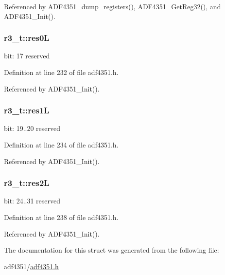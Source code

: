 Referenced by A\+D\+F4351\+\_\+dump\+\_\+registers(), A\+D\+F4351\+\_\+\+Get\+Reg32(), and A\+D\+F4351\+\_\+\+Init().

\subsubsection[{\texorpdfstring{res0L}{res0L}}]{ r3\+\_\+t\+::res0L}\hypertarget{structr3__t_aa10065b1b2c2aed70a9e4427e76db29a}{}\label{structr3__t_aa10065b1b2c2aed70a9e4427e76db29a}
bit\+: 17 reserved 

Definition at line 232 of file adf4351.\+h.



Referenced by A\+D\+F4351\+\_\+\+Init().

\subsubsection[{\texorpdfstring{res1L}{res1L}}]{ r3\+\_\+t\+::res1L}\hypertarget{structr3__t_ab655f5b258ae1446791fbe557680daa6}{}\label{structr3__t_ab655f5b258ae1446791fbe557680daa6}
bit\+: 19..20 reserved 

Definition at line 234 of file adf4351.\+h.



Referenced by A\+D\+F4351\+\_\+\+Init().

\subsubsection[{\texorpdfstring{res2L}{res2L}}]{ r3\+\_\+t\+::res2L}\hypertarget{structr3__t_a2a1f40b19f451868336ca6558f653f1d}{}\label{structr3__t_a2a1f40b19f451868336ca6558f653f1d}
bit\+: 24..31 reserved 

Definition at line 238 of file adf4351.\+h.



Referenced by A\+D\+F4351\+\_\+\+Init().



The documentation for this struct was generated from the following file\+:\begin{DoxyCompactItemize}
\item 
adf4351/\hyperlink{adf4351_8h}{adf4351.\+h}\end{DoxyCompactItemize}
